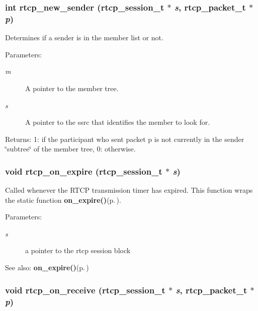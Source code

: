 \subsubsection{\setlength{\rightskip}{0pt plus 5cm}int rtcp\_\-new\_\-sender ({\bf rtcp\_\-session\_\-t} $\ast$ {\em s}, {\bf rtcp\_\-packet\_\-t} $\ast$ {\em p})}\label{rtcp_8c_a5}


Determines if a sender is in the member list or not. \begin{Desc}
\item[Parameters:]
\begin{description}
\item[{\em m}]A pointer to the member tree. \item[{\em s}]A pointer to the ssrc that identifies the member to look for. \end{description}
\end{Desc}
\begin{Desc}
\item[Returns:]1: if the participant who sent packet p is not currently in the sender \char`\"{}subtree\char`\"{} of the member tree, 0: otherwise. \end{Desc}
\subsubsection{\setlength{\rightskip}{0pt plus 5cm}void rtcp\_\-on\_\-expire ({\bf rtcp\_\-session\_\-t} $\ast$ {\em s})}\label{rtcp_8c_a12}


Called whenever the RTCP transmission timer has expired. This function wraps the static function {\bf on\_\-expire()}{\rm (p.\,\pageref{rtcp_8c_a16})}. \begin{Desc}
\item[Parameters:]
\begin{description}
\item[{\em s}]a pointer to the rtcp session block \end{description}
\end{Desc}
\begin{Desc}
\item[See also:]{\bf on\_\-expire()}{\rm (p.\,\pageref{rtcp_8c_a16})} \end{Desc}
\subsubsection{\setlength{\rightskip}{0pt plus 5cm}void rtcp\_\-on\_\-receive ({\bf rtcp\_\-session\_\-t} $\ast$ {\em s}, {\bf rtcp\_\-packet\_\-t} $\ast$ {\em p})}\label{rtcp_8c_a11}



